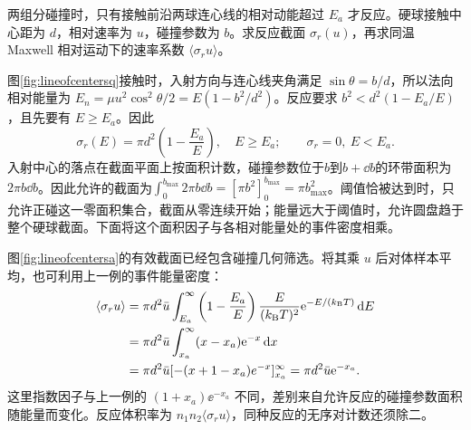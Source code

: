 \begin{example}[带能量阈值的硬球反应截面]
两组分碰撞时，只有接触前沿两球连心线的相对动能超过 $E_a$ 才反应。硬球接触中心距为 $d$，相对速率为 $u$，碰撞参数为 $b$。求反应截面 $\sigma_r(u)$，再求同温 Maxwell 相对运动下的速率系数 $\langle\sigma_ru\rangle$。
\end{example}
\begin{solution}
图\ref{fig:lineofcentersq}接触时，入射方向与连心线夹角满足 $\sin\theta=b/d$，所以法向相对能量为 $E_n=\mu u^2\cos^2\theta/2=E(1-b^2/d^2)$。反应要求 $b^2<d^2(1-E_a/E)$，且先要有 $E\ge E_a$。因此
\[
 \sigma_r(E)=\pi d^2\left(1-\frac{E_a}E\right),\quad E\ge E_a;
 \qquad \sigma_r=0,\ E<E_a.
\]
入射中心的落点在截面平面上按面积计数，碰撞参数位于$b$到$b+\dd b$的环带面积为$2\pi b\dd b$。因此允许的截面为$\int_0^{b_{\max}}2\pi b\dd b=[\pi b^2]_0^{b_{\max}}=\pi b_{\max}^2$。阈值恰被达到时，只允许正碰这一零面积集合，截面从零连续开始；能量远大于阈值时，允许圆盘趋于整个硬球截面。下面将这个面积因子与各相对能量处的事件密度相乘。

图\ref{fig:lineofcentersa}的有效截面已经包含碰撞几何筛选。将其乘 $u$ 后对体样本平均，也可利用上一例的事件能量密度：
\begin{align*}
 \langle\sigma_ru\rangle
 &=\pi d^2\bar u\int_{E_a}^\infty
 \left(1-\frac{E_a}E\right)\frac{E}{(k_{\mathrm B} T)^2}\mathrm e^{-E/(k_{\mathrm B} T)}\mathop{}\!\mathrm d E\\
 &=\pi d^2\bar u\int_{x_a}^\infty(x-x_a)\mathrm e^{-x}\mathop{}\!\mathrm d x\\
 &=\pi d^2\bar u[-(x+1-x_a)e^{-x}]_{x_a}^\infty
 =\pi d^2\bar u\mathrm e^{-x_a}.
\end{align*}
这里指数因子与上一例的 $(1+x_a)\ee^{-x_a}$ 不同，差别来自允许反应的碰撞参数面积随能量而变化。反应体积率为 $n_1n_2\langle\sigma_ru\rangle$，同种反应的无序对计数还须除二。
\end{solution}

